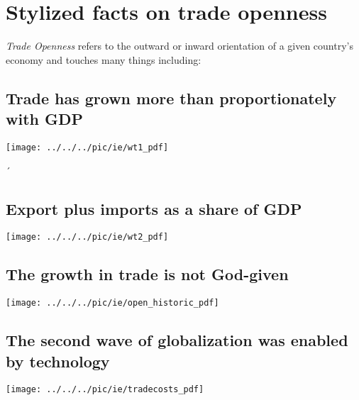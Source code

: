 \section{Stylized facts on trade openness}\label{sec:Stylized facts on trade openness}
\textit{Trade Openness} refers to the outward or inward orientation of a given country's economy and touches many things including:

\pbn

\subsection*{Trade has grown more than proportionately with GDP}
\begin{center}
	\texttt{[image: ../../../pic/ie/wt1\_pdf]}
\end{center}

´\subsection*{Export plus imports as a share of GDP}
\begin{center}
	\texttt{[image: ../../../pic/ie/wt2\_pdf]}
\end{center}

\subsection*{The growth in trade is not God-given }
\begin{center}
	\texttt{[image: ../../../pic/ie/open\_historic\_pdf]}
\end{center}

\subsection*{The second wave of globalization was enabled by technology}
\begin{center}
	\texttt{[image: ../../../pic/ie/tradecosts\_pdf]}
\end{center}


